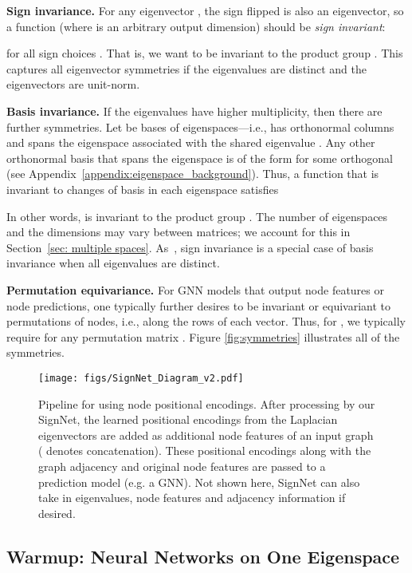 \documentclass{article} \usepackage{iclr2023_conference,times}
\begin{document}
\textbf{Sign invariance.} For any eigenvector , the sign flipped  is also an eigenvector,
so a function  (where  is an arbitrary output dimension) should be \textit{sign invariant}:

for all sign choices . That is, we want  to be invariant to the product group . This captures all eigenvector symmetries if the eigenvalues  are distinct and the eigenvectors are unit-norm.

\textbf{Basis invariance.} If the eigenvalues have higher multiplicity, then there are further symmetries. Let  be bases of eigenspaces---i.e.,  has orthonormal columns and spans the eigenspace associated with the shared eigenvalue . Any other orthonormal basis that spans the eigenspace is of the form  for some orthogonal  (see Appendix~\ref{appendix:eigenspace_background}). Thus, a function  that is invariant to changes of basis in each eigenspace satisfies 

In other words,  is invariant to the product group . The number of eigenspaces  and the dimensions  may vary between matrices; we account for this in Section~\ref{sec: multiple spaces}. As~, sign invariance is a special case of basis invariance when all eigenvalues are distinct.

\textbf{Permutation equivariance.} For GNN models that output node features or node predictions, one typically further desires  to be invariant or equivariant to permutations of nodes, i.e., along the rows of each vector. 
Thus, for , we typically require  for any permutation matrix . Figure \ref{fig:symmetries} illustrates all of the symmetries.




\begin{figure}[ht]
    \centering
    \texttt{[image: figs/SignNet\_Diagram\_v2.pdf]}
    \caption{Pipeline for using node positional encodings. After processing by our SignNet, the learned positional encodings from the Laplacian eigenvectors are added as additional node features of an input graph ( denotes concatenation).
    These positional encodings along with the graph adjacency and original node features are passed to a prediction model (e.g. a GNN).
    Not shown here, SignNet can also take in eigenvalues, node features and adjacency information if desired.}
    \label{fig:signnet_diagram}
\end{figure}

\subsection{Warmup: Neural Networks on One Eigenspace}\label{sec: warmup}
\end{document}
